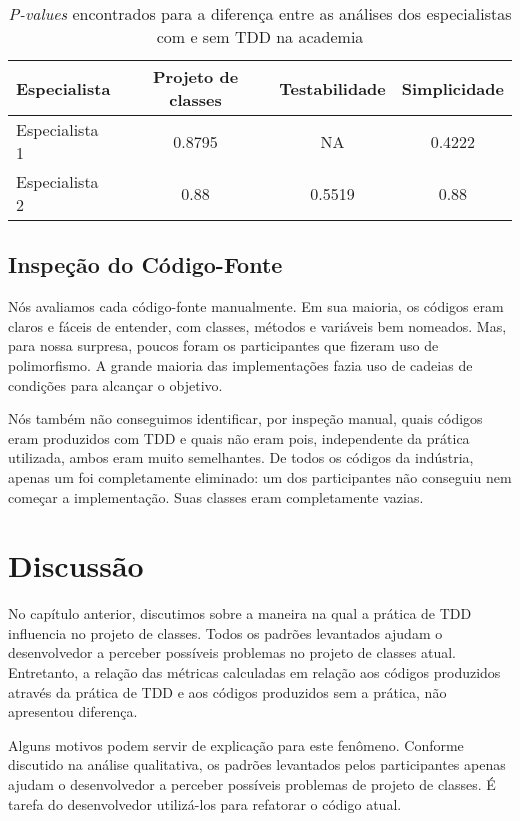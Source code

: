 \begin{table}[h!]
	\centering
	\begin{tabular}{| p{5cm} | c | c | c | }
		\hline
		Especialista & Projeto de classes & Testabilidade & Simplicidade\\
		\hline
		Especialista 1	& 0.8795 &	NA	& 0.4222\\
		Especialista 2	& 0.88	& 0.5519 &	0.88\\
		\hline
	\end{tabular}
	\caption{\textit{P-values} encontrados para a diferença entre as análises dos especialistas com e sem TDD na academia}
	\label{tab:especialistas-academia}
\end{table}

\subsection{Inspeção do Código-Fonte}

Nós avaliamos cada código-fonte manualmente.
Em sua maioria, os códigos eram claros e fáceis de entender,
com classes, métodos e variáveis bem nomeados.
Mas, para nossa surpresa,
poucos foram os participantes que fizeram uso de polimorfismo. A grande
maioria das implementações fazia uso de cadeias de condições para 
alcançar o objetivo.

Nós também não conseguimos identificar, por inspeção manual, quais códigos
eram produzidos com TDD e quais não eram pois, independente
da prática utilizada, ambos eram muito semelhantes.
De todos os códigos da indústria, apenas um foi completamente eliminado:
um dos participantes não conseguiu nem começar a implementação. Suas classes
eram completamente vazias. 


\section{Discussão}

No capítulo anterior, discutimos sobre a maneira na qual a prática de TDD
influencia no projeto de classes. Todos os padrões levantados ajudam
o desenvolvedor a perceber possíveis problemas no projeto de classes atual.
Entretanto, a relação das métricas calculadas em relação aos códigos
produzidos através da prática de TDD e aos códigos produzidos sem a prática,
não apresentou diferença.

Alguns motivos podem servir de explicação para este fenômeno. Conforme discutido na análise
qualitativa, os padrões levantados pelos
participantes apenas ajudam o desenvolvedor a perceber possíveis problemas
de projeto de classes. É tarefa do desenvolvedor utilizá-los para
refatorar o código atual. 

